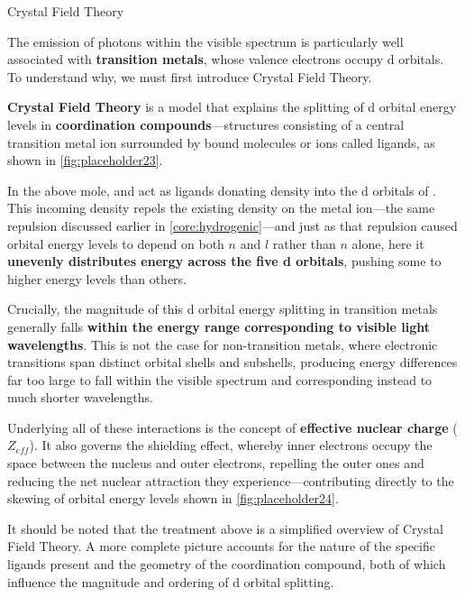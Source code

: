 \documentclass[10pt]{article}
\begin{document}
    \begin{core}{Crystal Field Theory}

      The emission of photons within the visible spectrum is particularly well associated with \textbf{transition metals}, whose valence electrons occupy d orbitals. To understand why, we must first introduce Crystal Field Theory.


      \textbf{Crystal Field Theory} is a model that explains the splitting of d orbital energy levels in \textbf{coordination compounds}---structures consisting of a central transition metal ion surrounded by bound molecules or ions called ligands, as shown in \autoref{fig:placeholder23}.


      In the above mole,  and  act as ligands donating  density into the d orbitals of . This incoming  density repels the existing  density on the metal ion---the same   repulsion discussed earlier in \autoref{core:hydrogenic}---and just as that repulsion caused orbital energy levels to depend on both $n$ and $l$ rather than $n$ alone, here it \textbf{unevenly distributes energy across the five d orbitals}, pushing some to higher energy levels than others.


      Crucially, the magnitude of this d orbital energy splitting in transition metals generally falls \textbf{within the energy range corresponding to visible light wavelengths}. This is not the case for non-transition metals, where electronic transitions span distinct orbital shells and subshells, producing energy differences far too large to fall within the visible spectrum and corresponding instead to much shorter wavelengths.

      Underlying all of these interactions is the concept of \textbf{effective nuclear charge} ($Z_{eff}$). It also governs the shielding effect, whereby inner electrons occupy the space between the nucleus and outer electrons, repelling the outer ones and reducing the net nuclear attraction they experience---contributing directly to the skewing of orbital energy levels shown in \autoref{fig:placeholder24}.

      It should be noted that the treatment above is a simplified overview of Crystal Field Theory. A more complete picture accounts for the nature of the specific ligands present and the geometry of the coordination compound, both of which influence the magnitude and ordering of d orbital splitting.

    \end{core}
\end{document}
